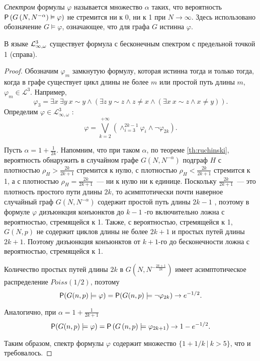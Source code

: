 
\Def \textit{Спектром} формулы $\varphi$ называется множество $\alpha$ таких, что вероятность $\P\left( G\left(N, N^{-\alpha}\right) \vDash \varphi  \right)$ не стремится ни к 0, ни к 1 при $N \rightarrow \infty$.
Здесь использовано обозначение $G \vDash \varphi$, означающее, что для графа $G$ истинна $\varphi$.

\begin{theorem}
В языке $\LL^3_{\infty, \omega}$ существует формула с бесконечным спектром с предельной точкой 1 (справа).
\end{theorem}
\begin{proof}
Обозначим $\varphi_m$ замкнутую формулу, которая истинна тогда и только тогда, когда в графе существует цикл длины не более $m$  или простой путь длины $m$,  $\varphi_m \in \mathcal{L}^3$. Например,
\[
\varphi_3 = \exists x ~\exists y ~
 x \sim y  \wedge \left( \exists z ~ y \sim z \wedge  z \neq x 
\wedge \left(\exists x ~ x \sim z \wedge x \neq y
\right) \right) .
\]
Определим $\varphi \in \mathcal{L}^3_{\infty, \omega}$ :
\[
\varphi = \bigvee_{k = 2}^{+\infty}\left(
\wedge_{i=3}^{2k-1} \varphi_{i}  \wedge \neg \varphi_{2k} \right).
\]

Пусть $\alpha = 1 + \frac{1}{2k}$.
Напомним, что при таком $\alpha$, по теореме \ref{th:ruchinski}, вероятность обнаружить в случайном графе $G(N, N^{-\alpha})$ подграф $H$ с плотностью $\rho_H > \frac{2k}{2k+1}$ стремится к нулю, с плотностью $\rho_H < \frac{2k}{2k+1}$ стремится к 1, а с плотностью $\rho_H = \frac{2k}{2k+1}$~--- ни к нулю ни к единице.
Поскольку $\frac{2k}{2k+1}$~--- это плотность простого пути длины $2k$, то асимптотически почти наверное случайный граф $G(N, N^{-\alpha})$ содержит простой путь длины $2k-1$ , поэтому в формуле $\varphi$ дизъюнкция конъюнктов до $k-1$ -го включительно ложна с вероятностью, стремящейся к 1.
Также, с вероятностью, стремящейся к 1, $G(N, p)$ не содержит циклов длины не более $2k+1$ и простых путей длины $2k+1$.
Поэтому дизъюнкция конъюнктов от $k+1$-го до бесконечности ложна с вероятностью, стремящейся к 1.

Количество простых путей длины $2k$ в $G(N, N^{-\frac{2k+1}{2k}})$ имеет асимптотическое распределение $Poiss(1/2)$, поэтому
$$
\P(G(n, p) \models \varphi) = 
\P(G(n, p) \models \neg \varphi_{2k}) \rightarrow e^{-1/2}.
$$

Аналогично, при $\alpha = 1 + \frac{1}{2k+1}$ 
$$\P(G(n, p) \models \varphi) = 
\P\left(G\left(n, p \right) \models  \varphi_{2k+1}\right) \rightarrow 1 - e^{-1/2}.$$

Таким образом, спектр формулы $\varphi$ содержит множество $\{1 + 1/k ~|~ k > 5 \}$, что и требовалось.
\end{proof}